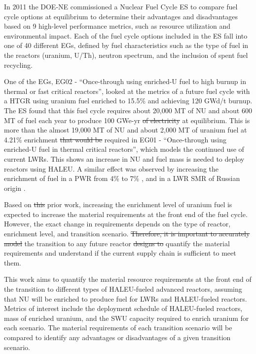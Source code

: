 \documentclass[preprint]{elsarticle}
\providecommand{\DIFaddtex}[1]{{\protect\color{blue}\uwave{#1}}} %
\providecommand{\DIFdeltex}[1]{{\protect\color{red}\sout{#1}}}                      %
\providecommand{\DIFaddbegin}{} %
\providecommand{\DIFaddend}{} %
\providecommand{\DIFdelbegin}{} %
\providecommand{\DIFdelend}{} %
\providecommand{\DIFadd}[1]{\texorpdfstring{\DIFaddtex{#1}}{#1}} %
\providecommand{\DIFdel}[1]{\texorpdfstring{\DIFdeltex{#1}}{}} %
\begin{document}
In 2011 the \gls{DOE-NE} commissioned a Nuclear Fuel Cycle \gls{ES} 
\cite{wigeland_nuclear_2014} to compare fuel cycle options at equilibrium
to determine their advantages and disadvantages
based on 9 high-level performance metrics, such as resource utilization and 
environmental impact. Each of the fuel cycle options included in the 
\gls{ES} fall into one of 40 different \glspl{EG}, defined by fuel 
characteristics such as the type of fuel in the reactors (uranium, 
U/Th), neutron spectrum, and the inclusion of spent fuel recycling. 

One of the \glspl{EG}, \gls{EG}02 - ``Once-through using enriched-U fuel to 
high burnup in thermal or fast critical reactors'', looked at the metrics 
of a future fuel cycle with a \gls{HTGR} using uranium fuel enriched to 
15.5\% and achieving 120 GWd/t burnup. The \gls{ES} found that this fuel cycle
requires about 20,000 MT of \gls{NU} and about 600 MT of fuel each year 
to produce 100 GWe-yr \DIFdelbegin \DIFdel{of electricity }\DIFdelend at equilibrium. This is more than the 
almost 19,000 MT of \gls{NU} and about 2,000 MT of uranium fuel at 4.21\%
enrichment \DIFdelbegin \DIFdel{that would be }\DIFdelend required in \gls{EG}01 - ``Once-through using enriched-U 
fuel in thermal critical reactors'', which models the continued use of current 
\glspl{LWR}. This shows an increase in \gls{NU} and fuel mass is needed to 
deploy reactors using \gls{HALEU}.
A similar effect was observed by increasing the enrichment of fuel in a 
\gls{PWR} from 4\% to 7\% \cite{burns_reactor_2020}, and in a \gls{LWR}
\gls{SMR} of Russian origin \cite{hernandez_potential_2020}. 

Based on \DIFdelbegin \DIFdel{this }\DIFdelend \DIFaddbegin \DIFadd{the }\DIFaddend prior work, increasing the enrichment level of uranium fuel 
is expected to  
increase the material requirements at the front end of 
the fuel cycle. However, the exact change in requirements depends 
on the type of reactor, enrichment level, and transition scenario.
\DIFdelbegin \DIFdel{Therefore, it is important to accurately model }\DIFdelend \DIFaddbegin \DIFadd{Modeling }\DIFaddend the transition to any future
reactor \DIFdelbegin \DIFdel{designs to }\DIFdelend \DIFaddbegin \DIFadd{design can }\DIFaddend quantify the material requirements \DIFaddbegin \DIFadd{of the transition
}\DIFaddend and understand if the current supply chain is sufficient to meet them. 

This work aims to quantify the material resource requirements at the front 
end of the 
transition to different types of \gls{HALEU}-fueled advanced reactors, 
assuming that \gls{NU} will be enriched to produce fuel for \glspl{LWR} and 
\gls{HALEU}-fueled reactors. 
Metrics of interest include the deployment schedule of \gls{HALEU}-fueled 
reactors, mass of enriched uranium, and the \gls{SWU} capacity required to 
enrich uranium for each scenario. The material requirements of each transition 
scenario will be compared to identify any advantages or disadvantages of 
a given transition scenario. 
\end{document}
